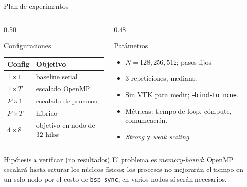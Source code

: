\documentclass[aspectratio=169]{beamer}
\begin{document}
\begin{frame}{Plan de experimentos}
  \begin{columns}[T]
    \begin{column}{0.50\textwidth}
      \begin{block}{Configuraciones}
        \scriptsize
        \begin{tabular}{ll}
          \toprule
          Config & Objetivo \\
          \midrule
          $1\times1$ & baseline serial \\
          $1\times T$ & escalado OpenMP \\
          $P\times1$ & escalado de procesos \\
          $P\times T$ & híbrido \\
          $4\times8$ & objetivo en nodo de 32 hilos \\
          \bottomrule
        \end{tabular}
      \end{block}
    \end{column}
    \begin{column}{0.48\textwidth}
      \begin{block}{Parámetros}
        \scriptsize
        \begin{itemize}
          \item $N=128,256,512$; pasos fijos.
          \item 3 repeticiones, mediana.
          \item Sin VTK para medir; \texttt{--bind-to none}.
          \item Métricas: tiempo de loop, cómputo, comunicación.
          \item \emph{Strong} y \emph{weak scaling}.
        \end{itemize}
      \end{block}
    \end{column}
  \end{columns}
  \vspace{2mm}
  \begin{block}{Hipótesis a verificar (no resultados)}
    \footnotesize
    El problema es \emph{memory-bound}: OpenMP escalará hasta saturar los
    núcleos físicos; los procesos no mejorarán el tiempo en un solo nodo por
    el costo de \texttt{bsp\_sync}; en varios nodos sí serán necesarios.
  \end{block}
\end{frame}

\end{document}
